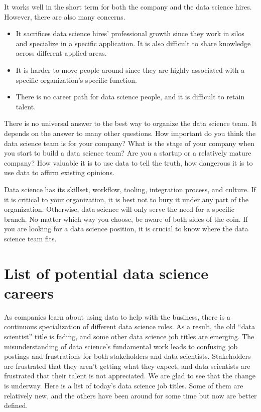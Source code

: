 \documentclass[
  12pt,
]{krantz}
\providecommand{\tightlist}{%
  \setlength{\itemsep}{0pt}\setlength{\parskip}{0pt}}
\begin{document}
It works well in the short term for both the company and the data science hires. However, there are also many concerns.

\begin{itemize}
\tightlist
\item
  It sacrifices data science hires' professional growth since they work in silos and specialize in a specific application. It is also difficult to share knowledge across different applied areas.
\item
  It is harder to move people around since they are highly associated with a specific organization's specific function.
\item
  There is no career path for data science people, and it is difficult to retain talent.
\end{itemize}

There is no universal answer to the best way to organize the data science team. It depends on the answer to many other questions. How important do you think the data science team is for your company? What is the stage of your company when you start to build a data science team? Are you a startup or a relatively mature company? How valuable it is to use data to tell the truth, how dangerous it is to use data to affirm existing opinions.

Data science has its skillset, workflow, tooling, integration process, and culture. If it is critical to your organization, it is best not to bury it under any part of the organization. Otherwise, data science will only serve the need for a specific branch. No matter which way you choose, be aware of both sides of the coin. If you are looking for a data science position, it is crucial to know where the data science team fits.

\hypertarget{list-of-potential-data-science-careers}{%
\section{List of potential data science careers}\label{list-of-potential-data-science-careers}}

As companies learn about using data to help with the business, there is a continuous specialization of different data science roles.
As a result, the old ``data scientist'' title is fading, and some other data science job titles are emerging. The misunderstanding of data science's fundamental work leads to confusing job postings and frustrations for both stakeholders and data scientists. Stakeholders are frustrated that they aren't getting what they expect, and data scientists are frustrated that their talent is not appreciated. We are glad to see that the change is underway. Here is a list of today's data science job titles. Some of them are relatively new, and the others have been around for some time but now are better defined.
\end{document}

